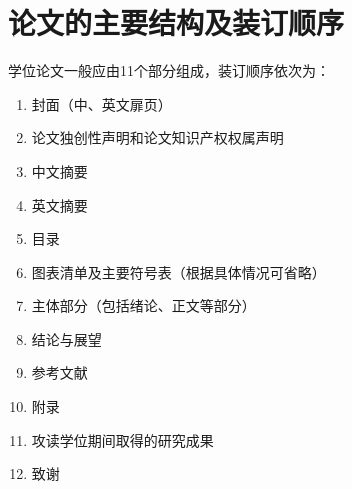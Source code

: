 
\chapter{论文的主要结构及装订顺序}
学位论文一般应由11个部分组成，装订顺序依次为：

\begin{enumerate}
\item 封面（中、英文扉页）
\item 论文独创性声明和论文知识产权权属声明
\item 中文摘要
\item 英文摘要
\item 目录
\item 图表清单及主要符号表（根据具体情况可省略）
\item 主体部分（包括绪论、正文等部分）
\item 结论与展望
\item 参考文献
\item 附录
\item 攻读学位期间取得的研究成果
\item 致谢
\end{enumerate}

